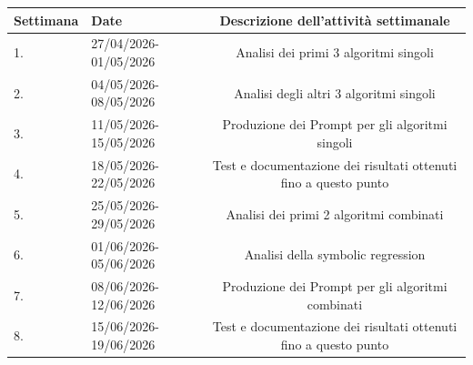 \begin{table}[ht]
    \vspace{0.2cm}
    \begin{tabular}{llc}
	\toprule
	\textbf{Settimana} & \textbf{Date} & \textbf{Descrizione dell'attività settimanale} \\\midrule
	1. & 27/04/2026-01/05/2026 & Analisi dei primi 3 algoritmi singoli \\
    2. & 04/05/2026-08/05/2026 & Analisi degli altri 3 algoritmi singoli \\
    3. & 11/05/2026-15/05/2026 & Produzione dei Prompt per gli algoritmi singoli \\
    4. & 18/05/2026-22/05/2026 & Test e documentazione dei risultati ottenuti fino a questo punto \\
    5. & 25/05/2026-29/05/2026 & Analisi dei primi 2 algoritmi combinati \\
    6. & 01/06/2026-05/06/2026 & Analisi della symbolic regression \\
    7. & 08/06/2026-12/06/2026 & Produzione dei Prompt per gli algoritmi combinati \\ 
    8. & 15/06/2026-19/06/2026 & Test e documentazione dei risultati ottenuti fino a questo punto \\\bottomrule
    \end{tabular}
\end{table}